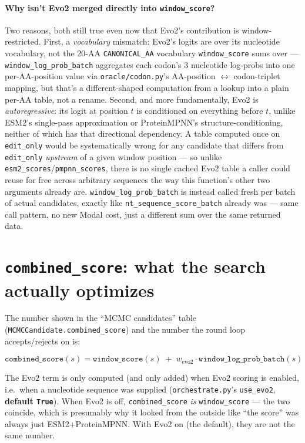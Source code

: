 \documentclass[11pt]{article}
\begin{document}
\paragraph{Why isn't Evo2 merged directly into \texttt{window\_score}?}
Two reasons, both still true even now that Evo2's contribution is
window-restricted. First, a \emph{vocabulary} mismatch: Evo2's logits are
over its nucleotide vocabulary, not the 20-AA \texttt{CANONICAL\_AA}
vocabulary \texttt{window\_score} sums over --- \texttt{window\_log\_prob\_batch}
aggregates each codon's 3 nucleotide log-probs into one per-AA-position value
via \texttt{oracle/codon.py}'s AA-position $\leftrightarrow$ codon-triplet
mapping, but that's a different-shaped computation from a lookup into a
plain per-AA table, not a rename. Second, and more fundamentally, Evo2 is
\emph{autoregressive}: its logit at position $t$ is conditioned on
everything before $t$, unlike ESM2's single-pass approximation or
ProteinMPNN's structure-conditioning, neither of which has that directional
dependency. A table computed once on \texttt{edit\_only} would be
systematically wrong for any candidate that differs from \texttt{edit\_only}
\emph{upstream} of a given window position --- so unlike
\texttt{esm2\_scores}/\texttt{pmpnn\_scores}, there is no single cached Evo2
table a caller could reuse for free across arbitrary sequences the way this
function's other two arguments already are. \texttt{window\_log\_prob\_batch}
is instead called fresh per batch of actual candidates, exactly like
\texttt{nt\_sequence\_score\_batch} already was --- same call pattern, no
new Modal cost, just a different sum over the same returned data.

\section{\texttt{combined\_score}: what the search actually optimizes}
\label{sec:combined}

The number shown in the ``MCMC candidates'' table
(\texttt{MCMCCandidate.combined\_score}) and the number the round loop
accepts/rejects on is:

\begin{equation}
  \texttt{combined\_score}(s) = \texttt{window\_score}(s) \;+\; w_{\text{evo2}} \cdot \texttt{window\_log\_prob\_batch}(s)
\end{equation}

The Evo2 term is only computed (and only added) when Evo2 scoring is
enabled, i.e.\ when a nucleotide sequence was supplied
(\texttt{orchestrate.py}'s \texttt{use\_evo2}, \textbf{default
\texttt{True}}). When Evo2 is off, \texttt{combined\_score} \emph{is}
\texttt{window\_score} --- the two coincide, which is presumably why it
looked from the outside like ``the score'' was always just ESM2+ProteinMPNN.
With Evo2 on (the default), they are not the same number.
\end{document}
